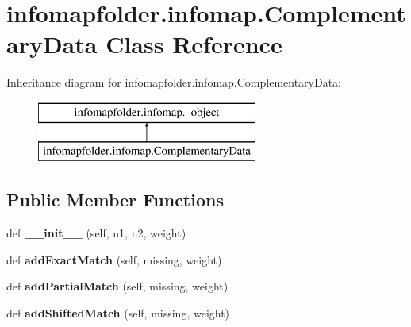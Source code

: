 \hypertarget{classinfomapfolder_1_1infomap_1_1ComplementaryData}{}\section{infomapfolder.\+infomap.\+Complementary\+Data Class Reference}
\label{classinfomapfolder_1_1infomap_1_1ComplementaryData}
Inheritance diagram for infomapfolder.\+infomap.\+Complementary\+Data\+:\begin{figure}[H]
\begin{center}
\leavevmode
\includegraphics[height=2.000000cm]{classinfomapfolder_1_1infomap_1_1ComplementaryData}
\end{center}
\end{figure}
\subsection*{Public Member Functions}
\begin{DoxyCompactItemize}
\item 
\mbox{\label{classinfomapfolder_1_1infomap_1_1ComplementaryData_a5045f7bd12f11d6166050cf36ca787bf}} 
def {\bfseries \+\_\+\+\_\+init\+\_\+\+\_\+} (self, n1, n2, weight)
\item 
\mbox{\label{classinfomapfolder_1_1infomap_1_1ComplementaryData_aa633f4a358a3816104407889084bcf37}} 
def {\bfseries add\+Exact\+Match} (self, missing, weight)
\item 
\mbox{\label{classinfomapfolder_1_1infomap_1_1ComplementaryData_af53ec58af34ea958e3d22a555b83e4f8}} 
def {\bfseries add\+Partial\+Match} (self, missing, weight)
\item 
\mbox{\label{classinfomapfolder_1_1infomap_1_1ComplementaryData_af68cb3fb88724d6efe37ab24fad6c921}} 
def {\bfseries add\+Shifted\+Match} (self, missing, weight)
\end{DoxyCompactItemize}
